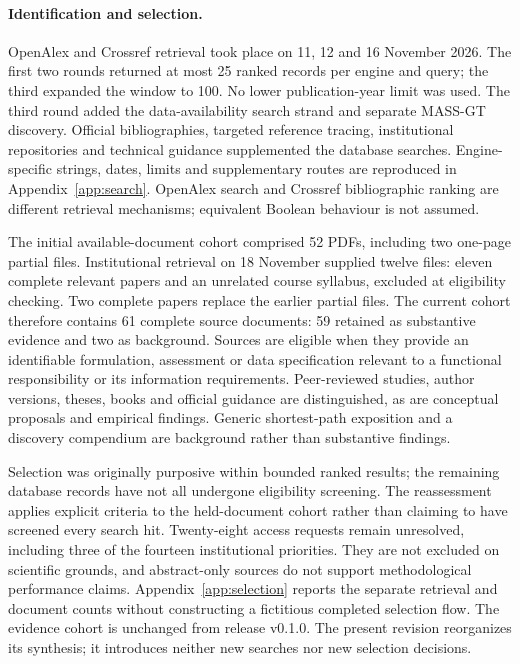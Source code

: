 \paragraph{Identification and selection.}
OpenAlex and Crossref retrieval took place on 11, 12 and 16 November 2026.
The first two rounds returned at most 25 ranked records per engine and query;
the third expanded the window to 100. No lower publication-year limit was used.
The third round added the data-availability search strand and separate MASS-GT discovery. Official
bibliographies, targeted reference tracing, institutional repositories and
technical guidance supplemented the database searches. Engine-specific strings,
dates, limits and supplementary routes are reproduced in
Appendix~\ref{app:search}. OpenAlex search and Crossref bibliographic ranking
are different retrieval mechanisms; equivalent Boolean behaviour is not assumed.

The initial available-document cohort comprised 52 PDFs, including two one-page
partial files. Institutional retrieval on 18 November supplied twelve files:
eleven complete relevant papers and an unrelated course syllabus, excluded at
eligibility checking. Two complete papers replace the earlier partial files.
The current cohort therefore contains 61 complete source documents: 59 retained
as substantive evidence and two as background. Sources are eligible when they provide
an identifiable formulation, assessment or data specification relevant to a
functional responsibility or its information requirements. Peer-reviewed studies, author versions, theses, books and
official guidance are distinguished, as are conceptual proposals and empirical
findings. Generic shortest-path exposition and a discovery compendium are
background rather than substantive findings.

Selection was originally purposive within bounded ranked results; the remaining
database records have not all undergone eligibility screening. The reassessment
applies explicit criteria to the held-document cohort rather than claiming to
have screened every search hit. Twenty-eight access requests remain unresolved,
including three of the fourteen institutional priorities. They are not excluded
on scientific grounds, and abstract-only sources do not support methodological
performance claims. Appendix~\ref{app:selection} reports the separate retrieval
and document counts without constructing a fictitious completed selection flow.
The evidence cohort is unchanged from release v0.1.0. The present revision
reorganizes its synthesis; it introduces neither new searches nor new selection
decisions.

